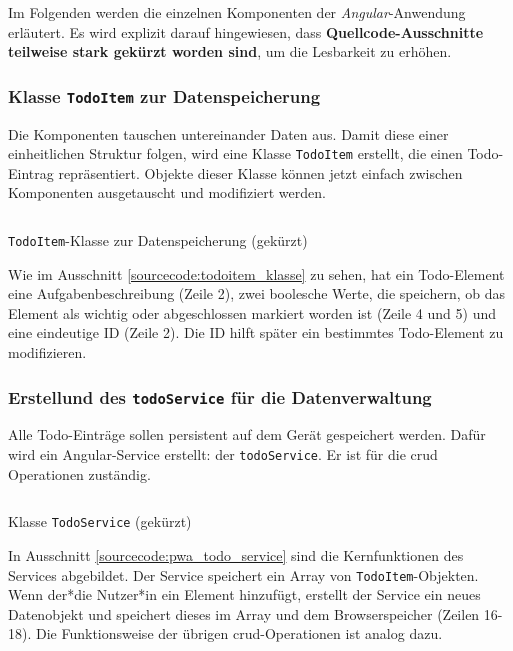 Im Folgenden werden die einzelnen Komponenten der \textit{Angular}-Anwendung erläutert. Es wird explizit darauf hingewiesen, dass \textbf{Quellcode-Ausschnitte teilweise stark gekürzt worden sind}, um die Lesbarkeit zu erhöhen.

\subsubsection{Klasse \texttt{TodoItem} zur Datenspeicherung}

Die Komponenten tauschen untereinander Daten aus. Damit diese einer einheitlichen Struktur folgen, wird eine Klasse \texttt{TodoItem} erstellt, die einen Todo-Eintrag repräsentiert. Objekte dieser Klasse können jetzt einfach zwischen Komponenten ausgetauscht und modifiziert werden.

\begin{listing}[h]
	\inputminted{TypeScript}{sourcecode/pwa_todoitem_klasse.js}
	\caption{\texttt{TodoItem}-Klasse zur Datenspeicherung (gekürzt)}
	\label{sourcecode:todoitem_klasse}
\end{listing}

Wie im Ausschnitt \ref{sourcecode:todoitem_klasse} zu sehen, hat ein Todo-Element eine Aufgabenbeschreibung (Zeile 2), zwei boolesche Werte, die speichern, ob das Element als wichtig oder abgeschlossen markiert worden ist (Zeile 4 und 5) und eine eindeutige ID (Zeile 2). Die ID hilft später ein bestimmtes Todo-Element zu modifizieren.

\subsubsection{Erstellund des \texttt{todoService} für die Datenverwaltung}
Alle Todo-Einträge sollen persistent auf dem Gerät gespeichert werden. Dafür wird ein Angular-Service erstellt: der \texttt{todoService}. Er ist für die \acf{crud} Operationen zuständig.

\begin{listing}[h]
	\inputminted{TypeScript}{sourcecode/pwa_todo_service.ts}
	\caption{Klasse \texttt{TodoService} (gekürzt)}
	\label{sourcecode:pwa_todo_service}
\end{listing}

In Ausschnitt \ref{sourcecode:pwa_todo_service} sind die Kernfunktionen des Services abgebildet. Der Service speichert ein Array von \texttt{TodoItem}-Objekten. Wenn der*die Nutzer*in ein Element hinzufügt, erstellt der Service ein neues Datenobjekt und speichert dieses im Array und dem Browserspeicher (Zeilen 16-18). Die Funktionsweise der übrigen \ac{crud}-Operationen ist analog dazu.

